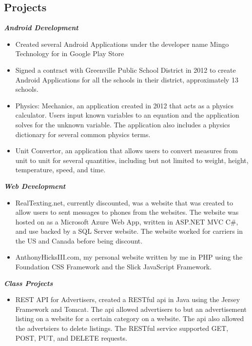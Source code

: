 \documentclass[margin=1in, 10pt]{res}
\begin{document}
\begin{resume}
\section{Projects}
\textbf{\textit{Android Development}}
	\begin{itemize}
		\item Created several Android Applications under the developer name Mingo Technology for in Google Play Store
		\item Signed a contract with Greenville Public School District in 2012 to create Android Applications for all the schools in their district, approximately 13 schools. 
		\item Physics: Mechanics, an application created in 2012 that acts as a physics calculator. Users input known variables to an equation and the application solves for the unknown variable. The application also includes a physics dictionary for several common physics terms. 
		\item Unit Convertor, an application that allows users to convert measures from unit to unit for several quantities, including but not limited to weight, height, temperature, speed, and time. 
	\end{itemize} 
\textbf{\textit{Web Development}}
	\begin{itemize}
		\item RealTexting.net, currently discounted, was a website that was created to allow users to sent messages to phones from the websites. The website was hosted on as a Microsoft Azure Web App, written in ASP.NET MVC C\#, and use backed by a SQL Server website. The website worked for carriers in the US and Canada before being discount. 
		\item AnthonyHicksIII.com, my personal website written by me in PHP using the Foundation CSS Framework and the Slick JavaScript Framework.
	\end{itemize}
\textbf{\textit{Class Projects}}
	\begin{itemize}
		\item REST API for Advertisers, created a RESTful api in Java using the Jersey Framework and Tomcat. The api allowed advertisers to but an advertisement listing on a website for a certain category on a website. The api also allowed the advertsiers to delete listings. The RESTful service supported GET, POST, PUT, and DELETE requests.  
	\end{itemize} 


\end{resume}
\end{document}
